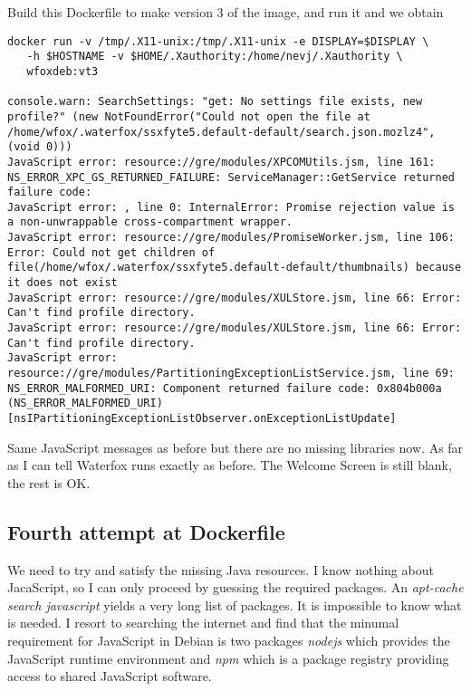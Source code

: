 \documentclass{article}  %
\begin{document}
Build this Dockerfile to make version 3 of the image, and run it and we obtain
\begin{verbatim}
docker run -v /tmp/.X11-unix:/tmp/.X11-unix -e DISPLAY=$DISPLAY \
   -h $HOSTNAME -v $HOME/.Xauthority:/home/nevj/.Xauthority \
   wfoxdeb:vt3

console.warn: SearchSettings: "get: No settings file exists, new profile?" (new NotFoundError("Could not open the file at /home/wfox/.waterfox/ssxfyte5.default-default/search.json.mozlz4", (void 0)))
JavaScript error: resource://gre/modules/XPCOMUtils.jsm, line 161: NS_ERROR_XPC_GS_RETURNED_FAILURE: ServiceManager::GetService returned failure code:
JavaScript error: , line 0: InternalError: Promise rejection value is a non-unwrappable cross-compartment wrapper.
JavaScript error: resource://gre/modules/PromiseWorker.jsm, line 106: Error: Could not get children of file(/home/wfox/.waterfox/ssxfyte5.default-default/thumbnails) because it does not exist
JavaScript error: resource://gre/modules/XULStore.jsm, line 66: Error: Can't find profile directory.
JavaScript error: resource://gre/modules/XULStore.jsm, line 66: Error: Can't find profile directory.
JavaScript error: resource://gre/modules/PartitioningExceptionListService.jsm, line 69: NS_ERROR_MALFORMED_URI: Component returned failure code: 0x804b000a (NS_ERROR_MALFORMED_URI) [nsIPartitioningExceptionListObserver.onExceptionListUpdate]
\end{verbatim}

Same JavaScript messages as before but there are no missing libraries now.  As far as I can tell Waterfox runs exactly as before.   The Welcome Screen is still blank, the rest is OK.

\subsection{Fourth attempt at Dockerfile}
 We need to try and satisfy the missing Java resources. I know nothing about JacaScript, so I can only proceed by guessing the required packages. 
An {\em apt-cache search javascript} yields a very long list of packages. It is impossible to know what is needed.  I resort to searching the internet and find that the minumal requirement for JavaScript in Debian is two packages {\em nodejs} which provides the JavaScript runtime environment and {\em npm} which is a package registry providing access to shared JavaScript software. 
\end{document}

